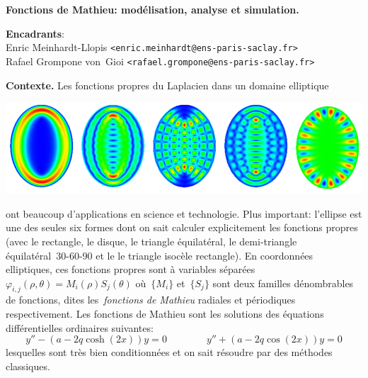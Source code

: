 \documentclass[a4paper,10pt]{article}
\begin{document}
\thispagestyle{empty}

{\bf
	Fonctions de Mathieu: modélisation, analyse et simulation.
}

{\bf Encadrants}:\\
Enric Meinhardt-Llopis \verb+<enric.meinhardt@ens-paris-saclay.fr>+\\
Rafael Grompone von~Gioi \verb+<rafael.grompone@ens-paris-saclay.fr>+

{\bf Contexte.}
Les fonctions propres du Laplacien dans un domaine elliptique
\vspace{-1em}
\begin{center}
	\includegraphics[width=0.9\linewidth]{f/ellnice.png}
\end{center}
\vspace{-2em}
ont beaucoup d'applications en science et technologie. Plus important:
l'ellipse est une des seules six formes dont on sait calculer
explicitement %
les fonctions propres (avec le rectangle, le disque, le triangle équilatéral,
le demi-triangle équilatéral~30-60-90 et le le triangle isocèle rectangle).  En
coordonnées elliptiques, ces fonctions propres sont à variables
séparées~$\varphi_{i,j}(\rho,\theta)=M_i(\rho)S_j(\theta)$ où~$\{M_i\}$
et~$\{S_j\}$ sont deux familles dénombrables de fonctions, dites
les~\emph{fonctions de Mathieu} radiales et périodiques
respectivement.  %
Les fonctions de Mathieu sont les solutions des
équations différentielles ordinaires suivantes:
\[
	y''-(a-2q\cosh(2x))y = 0
	\qquad
	\qquad
	y''+(a-2q\cos(2x))y = 0
\]
lesquelles sont très bien conditionnées et on sait résoudre par des méthodes
classiques.

\end{document}
